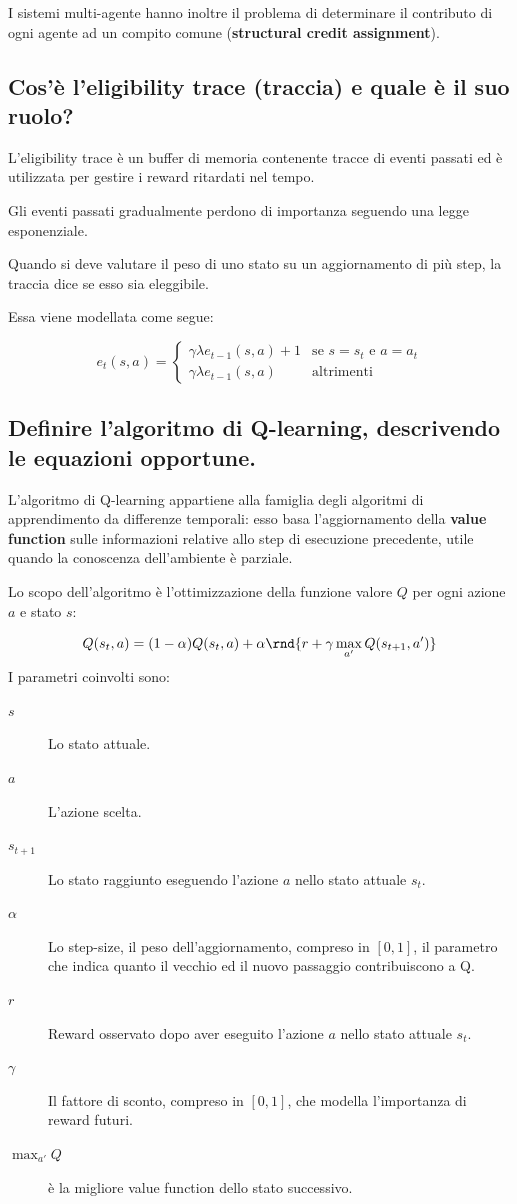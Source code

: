 \documentclass[\main/main.tex]{subfiles}
\begin{document}
I sistemi multi-agente hanno inoltre il problema di determinare il contributo di ogni agente ad un compito comune (\textbf{structural credit assignment}).

\subsection{Cos'è l'eligibility trace (traccia) e quale è il suo ruolo?}
L'eligibility trace è un buffer di memoria contenente tracce di eventi passati ed è utilizzata per gestire i reward ritardati nel tempo.

Gli eventi passati gradualmente perdono di importanza seguendo una legge esponenziale.

Quando si deve valutare il peso di uno stato su un aggiornamento di più step, la traccia dice se esso sia eleggibile.

Essa viene modellata come segue:

\[
  e_t(s,a) = \begin{cases}
    \gamma \lambda e_{t-1} (s,a) + 1 & \text{se } s=s_t \text{ e } a = a_t \\
    \gamma \lambda e_{t-1} (s,a)     & \text{altrimenti}
  \end{cases}
\]

\subsection{Definire l'algoritmo di Q-learning, descrivendo le equazioni opportune.}
L'algoritmo di Q-learning appartiene alla famiglia degli algoritmi di apprendimento da differenze temporali: esso basa l'aggiornamento della \textbf{value function} sulle informazioni relative allo step di esecuzione precedente, utile quando la conoscenza dell'ambiente è parziale.

Lo scopo dell'algoritmo è l'ottimizzazione della funzione valore $Q$ per ogni azione $a$ e stato $s$:

\[
  Q(s_t,a) = (1-\alpha)Q(s_t,a) + \alpha\rnd{r+\gamma\max_{a'}Q(s_{t+1},a')}
\]
I parametri coinvolti sono:
\begin{description}
  \item[$s$] Lo stato attuale.
  \item[$a$] L'azione scelta.
  \item[$s_{t+1}$] Lo stato raggiunto eseguendo l'azione $a$ nello stato attuale $s_t$.
  \item[$\alpha$] Lo step-size, il peso dell'aggiornamento, compreso in $[0,1]$, il parametro che indica quanto il vecchio ed il nuovo passaggio contribuiscono a Q.
  \item[$r$] Reward osservato dopo aver eseguito l'azione $a$ nello stato attuale $s_t$.
  \item[$\gamma$] Il fattore di sconto, compreso in $[0,1]$, che modella l'importanza di reward futuri.
  \item[$\max_{a'}Q$] è la migliore value function dello stato successivo.
\end{description}
\end{document}
